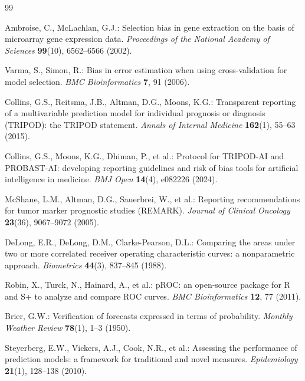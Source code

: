 \documentclass[11pt,twoside,openright]{book}
\begin{document}
\begin{thebibliography}{99}
\small

Ambroise, C., McLachlan, G.J.: Selection bias in gene extraction on the basis of microarray gene expression data.
\textit{Proceedings of the National Academy of Sciences} \textbf{99}(10), 6562--6566 (2002).

Varma, S., Simon, R.: Bias in error estimation when using cross-validation for model selection.
\textit{BMC Bioinformatics} \textbf{7}, 91 (2006).

Collins, G.S., Reitsma, J.B., Altman, D.G., Moons, K.G.: Transparent reporting of a multivariable prediction model for individual prognosis or diagnosis (TRIPOD): the TRIPOD statement.
\textit{Annals of Internal Medicine} \textbf{162}(1), 55--63 (2015).

Collins, G.S., Moons, K.G., Dhiman, P., et al.: Protocol for TRIPOD-AI and PROBAST-AI: developing reporting guidelines and risk of bias tools for artificial intelligence in medicine.
\textit{BMJ Open} \textbf{14}(4), e082226 (2024).

McShane, L.M., Altman, D.G., Sauerbrei, W., et al.: Reporting recommendations for tumor marker prognostic studies (REMARK).
\textit{Journal of Clinical Oncology} \textbf{23}(36), 9067--9072 (2005).

DeLong, E.R., DeLong, D.M., Clarke-Pearson, D.L.: Comparing the areas under two or more correlated receiver operating characteristic curves: a nonparametric approach.
\textit{Biometrics} \textbf{44}(3), 837--845 (1988).

Robin, X., Turck, N., Hainard, A., et al.: pROC: an open-source package for R and S+ to analyze and compare ROC curves.
\textit{BMC Bioinformatics} \textbf{12}, 77 (2011).

Brier, G.W.: Verification of forecasts expressed in terms of probability.
\textit{Monthly Weather Review} \textbf{78}(1), 1--3 (1950).

Steyerberg, E.W., Vickers, A.J., Cook, N.R., et al.: Assessing the performance of prediction models: a framework for traditional and novel measures.
\textit{Epidemiology} \textbf{21}(1), 128--138 (2010).


\end{thebibliography}
\end{document}
